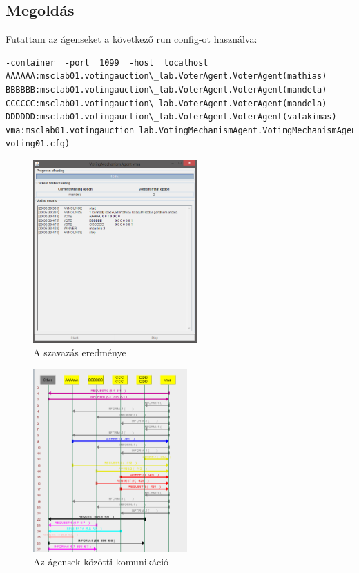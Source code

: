 \subsection{Megoldás}
Futattam az ágenseket a következő run config-ot használva:
\begin{lstlisting}[caption=Szavazás run config, frame=single,float=!ht]
-container  -port  1099  -host  localhost
AAAAAA:msclab01.votingauction\_lab.VoterAgent.VoterAgent(mathias)
BBBBBB:msclab01.votingauction\_lab.VoterAgent.VoterAgent(mandela)
CCCCCC:msclab01.votingauction\_lab.VoterAgent.VoterAgent(mandela)
DDDDDD:msclab01.votingauction\_lab.VoterAgent.VoterAgent(valakimas) vma:msclab01.votingauction_lab.VotingMechanismAgent.VotingMechanismAgent(cfg\backslash voting01.cfg)
\end{lstlisting}
\begin{figure}[!h]
\begin{center}
\includegraphics[height=7cm]{figures/ofel1a1.png}
\caption{A szavazás eredménye}
\end{center}
\end{figure}
\begin{figure}[!h]
\begin{center}
\includegraphics[height=7cm]{figures/ofel1a2.png}
\caption{Az ágensek közötti komunikáció}
\end{center}
\end{figure}
